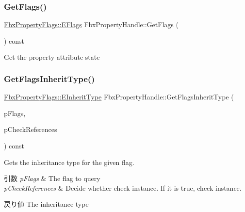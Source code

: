 \subsubsection{\texorpdfstring{Get\+Flags()}{GetFlags()}}
{\footnotesize\ttfamily \hyperlink{class_fbx_property_flags_afabfa7e0949aac8a7dcdf8a141867e99}{Fbx\+Property\+Flags\+::\+E\+Flags} Fbx\+Property\+Handle\+::\+Get\+Flags (\begin{DoxyParamCaption}{ }\end{DoxyParamCaption}) const}



Get the property attribute state 

\mbox{\label{class_fbx_property_handle_a90978a4383e1fc31bca8944dc35e39cd}} 
\subsubsection{\texorpdfstring{Get\+Flags\+Inherit\+Type()}{GetFlagsInheritType()}}
{\footnotesize\ttfamily \hyperlink{class_fbx_property_flags_ae3b667a4fcac4b827fa186a698fec2f8}{Fbx\+Property\+Flags\+::\+E\+Inherit\+Type} Fbx\+Property\+Handle\+::\+Get\+Flags\+Inherit\+Type (\begin{DoxyParamCaption}\item[{\hyperlink{class_fbx_property_flags_afabfa7e0949aac8a7dcdf8a141867e99}{Fbx\+Property\+Flags\+::\+E\+Flags}}]{p\+Flags,  }\item[{bool}]{p\+Check\+References }\end{DoxyParamCaption}) const}

Gets the inheritance type for the given flag. 
\begin{DoxyParams}{引数}
{\em p\+Flags} & The flag to query \\
\hline
{\em p\+Check\+References} & Decide whether check instance. If it is true, check instance. \\
\hline
\end{DoxyParams}
\begin{DoxyReturn}{戻り値}
The inheritance type 
\end{DoxyReturn}
\mbox{\label{class_fbx_property_handle_a2ae2817fc9113f00ad3b212de3acfad7}} 
